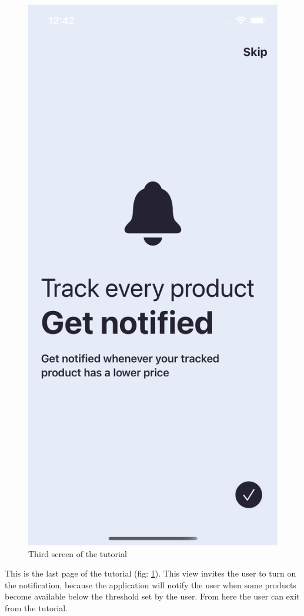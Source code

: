 \begin{figure}[h!]
        \centering
        \includegraphics[scale=0.15]{images/interfaces/tutorial_screen_3.png}
        \caption{Third screen of the tutorial}
        \label{fig:tutorial_screen_3}
\end{figure}
\FloatBarrier
This is the last page of the tutorial (fig: \ref{fig:tutorial_screen_3}). This view invites the user to turn on the notification, because the application will notify the user when some products become available below the threshold set by the user. From here the user can exit from the tutorial.

